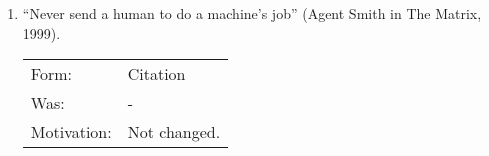 \documentclass[headinclude,footinclude,cleardoublepage=empty,
numbers=noenddot,fontsize=9pt]{scrbook}
\begin{document}
\begin{enumerate}
\item ``Never send a human to do a machine's job'' (Agent Smith in
  The Matrix, 1999).

  \begin{tabular}{l p{8cm}}
    Form:       & Citation \\
    Was:        & - \\
    Motivation: & Not changed. \\
  \end{tabular}

\end{enumerate}

%
%
%
%
%
%
\end{document}
